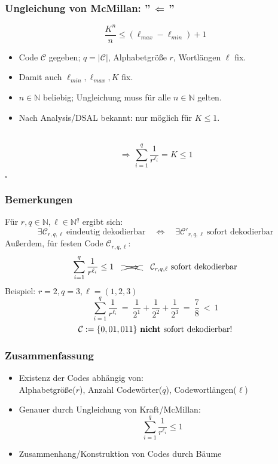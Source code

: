 \documentclass{beamer}
\begin{document}
\begin{frame}[t]
    \frametitle{Ungleichung von McMillan: ''$\,\Longleftarrow\,$''}
        $$
            \frac{K^n}{n} \leq (\ell_{max}-\ell_{min}) + 1
        $$
        \begin{itemize}
            \setlength\itemsep{1em}
            \item Code $\mathcal{C}$ gegeben; $q = |\mathcal{C}|$, Alphabetgröße $r$, Wortlängen $\ell$ fix.
            \item Damit auch $\ell_{min},\ell_{max}, K$ fix.
            \pause
            \item $n \in \mathbb{N}$ beliebig; Ungleichung muss für alle $n \in \mathbb{N}$ gelten.
            \item Nach Analysis/DSAL bekannt: nur möglich für $K \leq 1$.
        \end{itemize}
        \strut\\
        $$
            \,\Longrightarrow\, \sum_{i=1}^{q} \frac{1}{r^{\ell_i}} = K \leq 1
        $$
        \strut\hfill$\square$
\end{frame}

\begin{frame}[t]
    \frametitle{Bemerkungen}
    Für $r,q \in \mathbb{N}, \ell \in \mathbb{N}^q$ ergibt sich:
    $$
        \exists \mathcal{C}_{r,q,\ell}\ \text{eindeutig dekodierbar}
        \quad\Longleftrightarrow\quad
        \exists \mathcal{C}'_{r,q,\ell}\ \text{sofort dekodierbar}
    $$
    \pause
    Außerdem, für festen Code $\mathcal{C}_{r,q,\ell}:$
    $$
        \sum_{i=1}^{q} \frac{1}{r^{\ell_i}} \leq 1
        \quad\xcancel{\large\ \Longrightarrow\ }\quad
        \mathcal{C}_{r,q,\ell}\ \text{sofort dekodierbar}
    $$
    \pause
    Beispiel: $r=2,q=3,\ell=(1,2,3)$
    $$
        \sum_{i=1}^{q} \frac{1}{r^{\ell_i}}
        \ =\ \frac{1}{2^1} + \frac{1}{2^2} + \frac{1}{2^3}
        \ =\ \frac{7}{8}
        \ <\ 1
    $$
    $$
        \mathcal{C} := \{0,01,011\}\ \text{\textbf{nicht} sofort dekodierbar!}
    $$
\end{frame}


\begin{frame}[t]
    \frametitle{Zusammenfassung}

    \begin{itemize}
        \setlength\itemsep{1em}
        \item Existenz der Codes abhängig von:\\
            Alphabetgröße($r$), Anzahl Codewörter($q$), Codewortlängen($\ell$)
        \item Genauer durch Ungleichung von Kraft/McMillan:
            $$
                \sum_{i=1}^{q} \frac{1}{r^{\ell_i}} \leq 1
            $$
        \item Zusammenhang/Konstruktion von Codes durch Bäume
    \end{itemize}

\end{frame}
\end{document}
